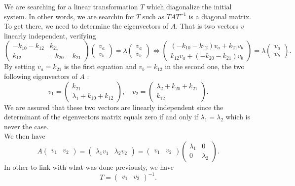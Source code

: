 We are searching for a linear transformation $T$ which diagonalize the initial system. In other words, we are searchin for $T$ such as $TAT^{-1}$ is a diagonal matrix. To get there, we need to determine the eigenvectors of $A$. That is two vectors $v$ linearly independent, verifying
$$\begin{pmatrix}
-k_{10}-k_{12} & k_{21} \\
k_{12} & -k_{20}-k_{21}
\end{pmatrix}
\begin{pmatrix}
v_a\\
v_b
\end{pmatrix}=
\lambda
\begin{pmatrix}
v_a\\
v_b
\end{pmatrix}
\iff
\begin{pmatrix}
(-k_{10}-k_{12})v_a + k_{21}v_b\\
k_{12}v_a + (-k_{20}-k_{21})v_b
\end{pmatrix}=
\lambda
\begin{pmatrix}
v_a\\
v_b
\end{pmatrix}.$$
By setting $v_a = k_{21}$ is the first equation and $v_b=k_{12}$ in the second one, the two following eigenvectors of $A$ : 
$$v_1=\begin{pmatrix}
k_{21}\\
\lambda_1 +k_{10} + k_{12}
\end{pmatrix}, \quad
v_2 =
\begin{pmatrix}
\lambda_2 +k_{20} + k_{21}\\
k_{12}
\end{pmatrix}.$$
We are assured that these two vectors are linearly independent since the determinant of the eigenvectors matrix equals zero if and only if $\lambda_1=\lambda_2$ which is never the case.\\
We then have
$$A\begin{pmatrix}
v_1 & v_2 
\end{pmatrix}=
\begin{pmatrix}
\lambda_1 v_1 & \lambda_2 v_2
\end{pmatrix}=
\begin{pmatrix}
v_1 & v_2 
\end{pmatrix}
\begin{pmatrix}
\lambda_1 & 0\\
0 & \lambda_2
\end{pmatrix}.$$
In other to link with what was done previously, we have 
$$T = \begin{pmatrix}
v_1 & v_2 
\end{pmatrix}^{-1}.$$
